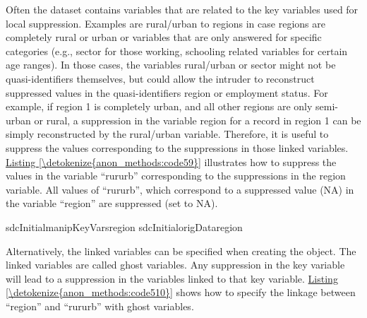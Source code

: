 \documentclass[letterpaper,10pt,english]{sphinxmanual}
\begin{document}
Often the dataset contains variables that are related to the key
variables used for local suppression. Examples are rural/urban to
regions in case regions are completely rural or urban or variables that
are only answered for specific categories (e.g., sector for those
working, schooling related variables for certain age ranges). In those
cases, the variables rural/urban or sector might not be
quasi-identifiers themselves, but could allow the intruder to
reconstruct suppressed values in the quasi-identifiers region or
employment status. For example, if region 1 is completely urban, and all
other regions are only semi-urban or rural, a suppression in the
variable region for a record in region 1 can be simply reconstructed by
the rural/urban variable. Therefore, it is useful to suppress the values
corresponding to the suppressions in those linked variables. \hyperref[\detokenize{anon_methods:code59}]{Listing \ref{\detokenize{anon_methods:code59}}}
illustrates how to suppress the values in the variable “rururb”
corresponding to the suppressions in the region variable. All values of
“rururb”, which correspond to a suppressed value (NA) in the variable
“region” are suppressed (set to NA).

\def\sphinxLiteralBlockLabel{\label{\detokenize{anon_methods:code59}}}
%
\begin{sphinxVerbatim}[commandchars=\\\{\},numbers=left,firstnumber=1,stepnumber=1]
 \PYG{p}{[}sdcInitialmanipKeyVarsregion  sdcInitialorigDataregion\PYG{p}{]}  
\end{sphinxVerbatim}

Alternatively, the linked variables can be specified when creating the
 object. The linked variables are called ghost variables. Any
suppression in the key variable will lead to a suppression in the
variables linked to that key variable. \hyperref[\detokenize{anon_methods:code510}]{Listing \ref{\detokenize{anon_methods:code510}}} shows how to specify
the linkage between “region” and “rururb” with ghost variables.
\end{document}
